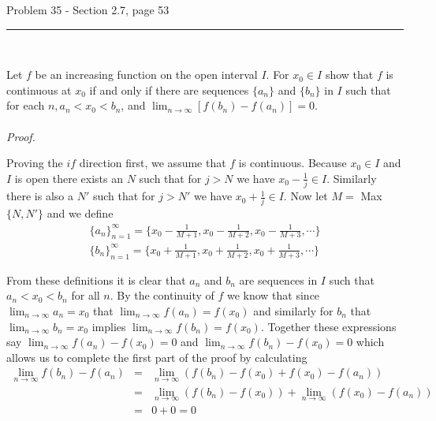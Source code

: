 \documentclass[11pt,reqno]{article}
\begin{document}
\begin{flushleft} 
Problem 35 - Section 2.7, page 53\\
\rule{500pt}{1pt}\\
\end{flushleft} 

Let $f$ be an increasing function on the open interval $I$. For $x_0 \in I$ show that $f$ is continuous at $x_0$ if and only if there are sequences $\{ a_n \}$ and $\{ b_n \}$ in $I$ such that for each $n, a_n < x_0 < b_n$,  and $\lim_{n \to \infty} [f(b_n) - f(a_n)] = 0$.
\\\\ \emph{Proof.}

Proving the $if$ direction first, we assume that $f$ is continuous. Because $x_0 \in I$ and $I$ is open there exists an $N$ such that for $j > N$ we have $x_0 - \frac{1}{j} \in I$. Similarly there is also a $N'$ such that for $j > N'$ we have $x_0 + \frac{1}{j} \in I$. Now let $M = $ Max $\{N, N'\}$ and we define 
\begin{eqnarray*}
\{ a_n \}_{n = 1}^\infty = \{ x_0 - \frac{1}{M+1}, x_0 - \frac{1}{M+2}, x_0 - \frac{1}{M+3}, \cdots \} \\  
\{ b_n \}_{n = 1}^\infty = \{ x_0 + \frac{1}{M+1}, x_0 + \frac{1}{M+2}, x_0 + \frac{1}{M+3}, \cdots \}
\end{eqnarray*}

\noindent From these definitions it is clear that $a_n$ and $b_n$ are sequences in $I$ such that $a_n < x_0 < b_n$ for all $n$. By the continuity of $f$ we know that since $\lim_{n \to \infty} a_n = x_0$ that $\lim_{n \to \infty} f(a_n) = f(x_0)$ and similarly for $b_n$ that $\lim_{n \to \infty} b_n = x_0$ implies $\lim_{n \to \infty} f(b_n) = f(x_0)$. Together these expressions say $\lim_{n \to \infty} f(a_n) - f(x_0) = 0$ and $\lim_{n \to \infty} f(b_n) - f(x_0) = 0$ which allows us to complete the first part of the proof by calculating
\begin{eqnarray*}
\lim_{n \to \infty} f(b_n) - f(a_n) &=& \lim_{n \to \infty} (f(b_n) - f(x_0) + f(x_0) - f(a_n)) \\
&=& \lim_{n \to \infty} (f(b_n) - f(x_0)) +   \lim_{n \to \infty} (f(x_0) - f(a_n)) \\
&=& 0 + 0 = 0
\end{eqnarray*}
\end{document}
